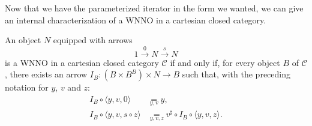 Now that we have the parameterized iterator in the form we wanted, we can give an internal characterization of a WNNO in a cartesian closed category.

\begin{corollary}
    An object $N$ equipped with arrows
    \[ 1 \xrightarrow{0} N \xrightarrow{s} N \]
    is a WNNO in a cartesian closed category $\mathcal{C}$ if and only if, for every object $B$ of $\mathcal{C}$, there exists an arrow $I_B : (B \times B^B) \times N \to B$ such that, with the preceding notation for $y$, $v$ and $z$:
    \begin{align*}
        I_B \circ \langle y,v,0\rangle &\underset{y,v}{=} y, \\
        I_B \circ \langle y,v,s \circ z\rangle &\underset{y,v,z}{=} v^\sharp \circ I_B \circ \langle y,v,z\rangle.
    \end{align*}
\end{corollary}

